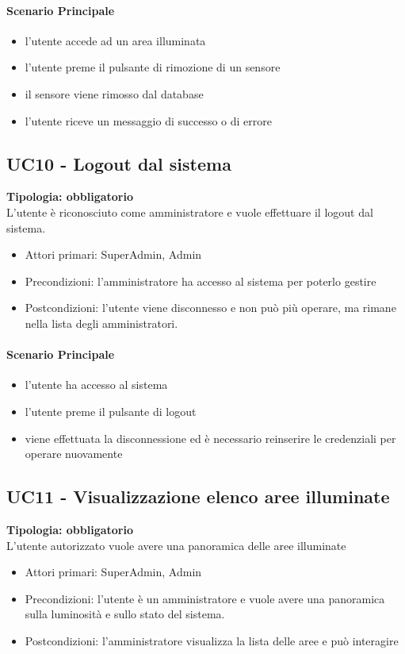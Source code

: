 \documentclass[12pt]{article}
\begin{document}
\paragraph{Scenario Principale}
\begin{itemize}
	\item l'utente accede ad un area illuminata
	\item l'utente preme il pulsante di rimozione di un sensore
	\item il sensore viene rimosso dal database
	\item l'utente riceve un messaggio di successo o di errore
\end{itemize}


\subsection{UC10 - Logout dal sistema}
\textbf{Tipologia: obbligatorio} \\
L'utente è riconosciuto come amministratore e vuole effettuare il logout dal sistema.
\begin{itemize}
	\item Attori primari: SuperAdmin, Admin
	\item Precondizioni: l'amministratore ha accesso al sistema per poterlo gestire
	\item Postcondizioni: l'utente viene disconnesso e non può più operare, ma rimane nella lista degli amministratori.
\end{itemize}
\paragraph{Scenario Principale}
\begin{itemize}
	\item l'utente ha accesso al sistema
	\item l'utente preme il pulsante di logout
	\item viene effettuata la disconnessione ed è necessario reinserire le credenziali per operare nuovamente
\end{itemize}


\subsection{UC11 - Visualizzazione elenco aree illuminate}
\textbf{Tipologia: obbligatorio} \\
L'utente autorizzato vuole avere una panoramica delle aree illuminate
\begin{itemize}
	\item Attori primari: SuperAdmin, Admin
	\item Precondizioni: l'utente è un amministratore e vuole avere una panoramica sulla luminosità e sullo stato del sistema.
	\item Postcondizioni: l'amministratore visualizza la lista delle aree e può interagire
\end{itemize}
\end{document}
